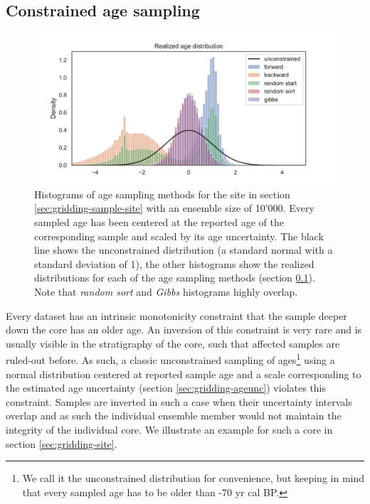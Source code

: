 \documentclass[
11pt, %
english, %
singlespacing, %
headsepline, %
]{MastersDoctoralThesis} %
\begin{document}
\begin{NoHyper}
\begin{refsection}
\subsection{Constrained age sampling}  \label{sec:gridding-age-sampling}

\begin{figure}
	\includegraphics[width=\linewidth]{gridding-figures/age-sampling-methods-realized.pdf}
	\caption[Scaled histograms of age sampling methods]{Histograms of age sampling methods for the site in section \ref{sec:gridding-sample-site} with an ensemble size of 10'000. Every sampled age has been centered at the reported age of the corresponding sample and scaled by its age uncertainty. The black line shows the unconstrained distribution (a standard normal with a standard deviation of 1), the other histograms show the realized distributions for each of the age sampling methods (section \ref{sec:gridding-age-sampling}). Note that \textit{random sort} and \textit{Gibbs} histograms highly overlap.}
	\label{fig:gridding-age-sampling-methods}
\end{figure}

Every dataset has an intrinsic monotonicity constraint that the sample deeper down the core has an older age. An inversion of this constraint is very rare and is usually visible in the stratigraphy of the core, such that affected samples are ruled-out before. As such, a classic unconstrained sampling of ages\footnote{\label{foot:unconstrained-note}We call it the unconstrained distribution for convenience, but keeping in mind that every sampled age has to be older than -70 yr cal BP.} using a normal distribution centered at reported sample age and a scale corresponding to the estimated age uncertainty (section \ref{sec:gridding-ageunc}) violates this constraint. Samples are inverted in such a case when their uncertainty intervals overlap and as such the individual ensemble member would not maintain the integrity of the individual core. We illustrate an example for such a core in section \ref{sec:gridding-site}.


\end{refsection}
\end{NoHyper}
\end{document}
